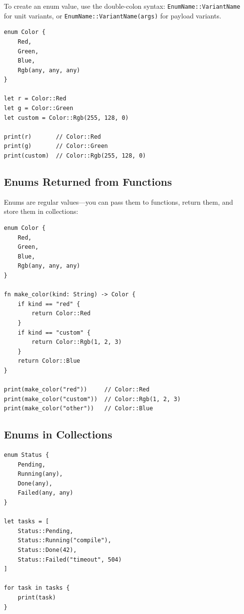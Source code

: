 To create an enum value, use the double-colon syntax:
\lstinline|EnumName::VariantName| for unit variants, or
\lstinline|EnumName::VariantName(args)| for payload variants.

\begin{lstlisting}[language=Lattice, caption={Constructing enum variants}]
enum Color {
    Red,
    Green,
    Blue,
    Rgb(any, any, any)
}

let r = Color::Red
let g = Color::Green
let custom = Color::Rgb(255, 128, 0)

print(r)       // Color::Red
print(g)       // Color::Green
print(custom)  // Color::Rgb(255, 128, 0)
\end{lstlisting}

\subsection{Enums Returned from Functions}

Enums are regular values---you can pass them to functions, return them, and
store them in collections:

\begin{lstlisting}[language=Lattice, caption={Returning enums from functions}]
enum Color {
    Red,
    Green,
    Blue,
    Rgb(any, any, any)
}

fn make_color(kind: String) -> Color {
    if kind == "red" {
        return Color::Red
    }
    if kind == "custom" {
        return Color::Rgb(1, 2, 3)
    }
    return Color::Blue
}

print(make_color("red"))     // Color::Red
print(make_color("custom"))  // Color::Rgb(1, 2, 3)
print(make_color("other"))   // Color::Blue
\end{lstlisting}

\subsection{Enums in Collections}

\begin{lstlisting}[language=Lattice, caption={An array of enum values}]
enum Status {
    Pending,
    Running(any),
    Done(any),
    Failed(any, any)
}

let tasks = [
    Status::Pending,
    Status::Running("compile"),
    Status::Done(42),
    Status::Failed("timeout", 504)
]

for task in tasks {
    print(task)
}
\end{lstlisting}

